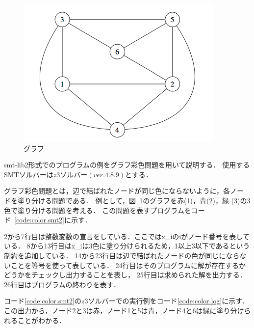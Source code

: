 %
%
\begin{figure}[tb]
  \centering
  \includegraphics[width=0.6\linewidth]{fig/graph3.pdf}
  \caption{グラフ}
  \label{fig:graph}
\end{figure}
smt-lib2形式でのプログラムの例をグラフ彩色問題を用いて説明する．
使用するSMTソルバーは$z3ソルバー(ver.4.8.9)$とする．

グラフ彩色問題とは，辺で結ばれたノードが同じ色にならないように，各ノー
ドを塗り分ける問題である．
例として，図~\ref{fig:graph}のグラフを赤(1)，青(2)，緑
(3)の3色で塗り分ける問題を考える．
この問題を表すプログラムをコード~\ref{code:color.smt2}に示す．

2から7行目は整数変数の宣言をしている．ここではx\_iのiがノード番号を表している．
8から13行目はx\_iは3色に塗り分けられるため，1以上3以下であるという制約を追加している．
14から23行目は辺で結ばれたノードの色が同じにならないことを等号を使って表している．
24行目はそのプログラムに解が存在するかどうかをチェックし出力することを表し，
25行目は求められた解を出力する．
26行目はプログラムの終わりを表す．

コード\ref{code:color.smt2}の$z3ソルバー$での実行例をコード\ref{code:color.log}に示す．
この出力から，ノード2と3は赤，ノード1と5は青，ノード4と6は緑に塗り分けられることがわかる．








